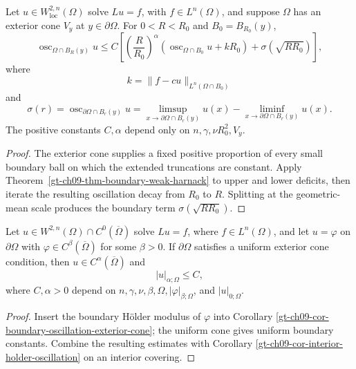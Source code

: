 \begin{corollary}
\label{gt-ch09-cor-boundary-oscillation-exterior-cone}
Let $u\in W^{2,n}_{\mathrm{loc}}(\Omega)$ solve $Lu=f$, with
$f\in L^n(\Omega)$, and suppose $\Omega$ has an exterior cone $V_y$ at
$y\in\partial\Omega$.  For $0<R<R_0$ and $B_0=B_{R_0}(y)$,
\begin{equation}\tag{9.66}
\operatorname{osc}_{\Omega\cap B_R(y)}u
\le C\left[
\left(\frac R{R_0}\right)^\alpha
\left(\operatorname{osc}_{\Omega\cap B_0}u+kR_0\right)
+\sigma(\sqrt{RR_0})\right],
\end{equation}
where
\[
k=\|f-cu\|_{L^n(\Omega\cap B_0)}
\]
and
\[
\sigma(r)=\operatorname{osc}_{\partial\Omega\cap B_r(y)}u
=\limsup_{x\to\partial\Omega\cap B_r(y)}u(x)
-\liminf_{x\to\partial\Omega\cap B_r(y)}u(x).
\]
The positive constants $C,\alpha$ depend only on
$n,\gamma,\nu R_0^2,V_y$.
\end{corollary}
\begin{proof}
\sketch The exterior cone supplies a fixed positive proportion of every
small boundary ball on which the extended truncations are constant.  Apply
Theorem~\ref{gt-ch09-thm-boundary-weak-harnack} to upper and lower deficits,
then iterate the resulting oscillation decay from $R_0$ to $R$.  Splitting
at the geometric-mean scale produces the boundary term
$\sigma(\sqrt{RR_0})$.
\end{proof}

\begin{corollary}
\label{gt-ch09-cor-global-holder-exterior-cone}
Let $u\in W^{2,n}(\Omega)\cap C^0(\overline\Omega)$ solve $Lu=f$, where
$f\in L^n(\Omega)$, and let $u=\varphi$ on $\partial\Omega$ with
$\varphi\in C^\beta(\overline\Omega)$ for some $\beta>0$.  If
$\partial\Omega$ satisfies a uniform exterior cone condition, then
$u\in C^\alpha(\overline\Omega)$ and
\begin{equation}\tag{9.67}
|u|_{\alpha;\Omega}\le C,
\end{equation}
where $C,\alpha>0$ depend on
$n,\gamma,\nu,\beta,\Omega,|\varphi|_{\beta;\Omega}$, and
$|u|_{0;\Omega}$.
\end{corollary}
\begin{proof}
\sketch Insert the boundary H\"older modulus of $\varphi$ into Corollary
\ref{gt-ch09-cor-boundary-oscillation-exterior-cone}; the uniform cone gives
uniform boundary constants.  Combine the resulting estimates with Corollary
\ref{gt-ch09-cor-interior-holder-oscillation} on an interior covering.
\end{proof}

